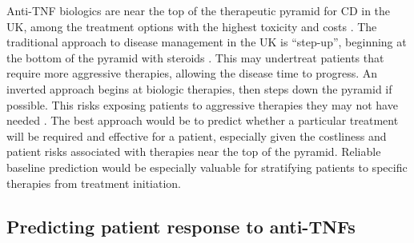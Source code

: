 Anti-\gls{TNF} biologics are near the top of the therapeutic pyramid for \gls{CD} in the UK, among the treatment options with the highest toxicity and costs \autocite{rogler2015WhereAreWe}.
The traditional approach to disease management in the UK is \enquote{step-up}, beginning at the bottom of the pyramid with steroids \autocite{rogler2015WhereAreWe,adegbola2018AntiTNFTherapyCrohn}.
This may undertreat patients that require more aggressive therapies, allowing the disease time to progress.
An inverted approach begins at biologic therapies, then steps down the pyramid if possible.
This risks exposing patients to aggressive therapies they may not have needed \autocite{flamant2018InflammatoryBowelDisease}.
The best approach would be to predict whether a particular treatment will be required and effective for a patient, especially given the costliness and patient risks associated with therapies near the top of the pyramid.
Reliable baseline prediction would be especially valuable for stratifying patients to specific therapies from treatment initiation.

\subsection{Predicting patient response to anti-TNFs}
\label{subsec:multiPANTS_intro_predicting_response}

